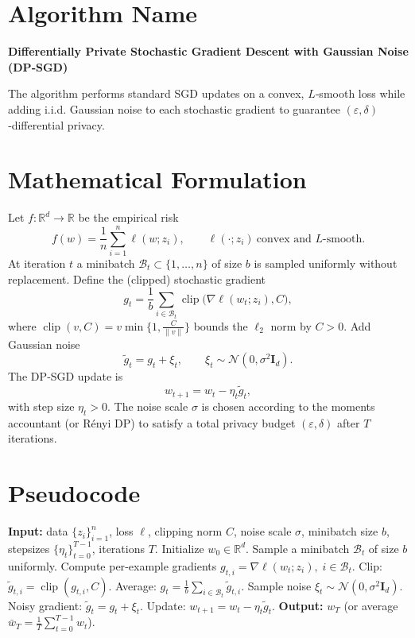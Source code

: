 \documentclass{article}
\newcommand{\RR}{\mathbb{R}}
\begin{document}
\section*{Algorithm Name}
\textbf{Differentially Private Stochastic Gradient Descent with Gaussian Noise (DP‑SGD)}  

The algorithm performs standard SGD updates on a convex, $L$‑smooth loss while adding i.i.d. Gaussian noise to each stochastic gradient to guarantee $(\varepsilon,\delta)$‑differential privacy.

\section*{Mathematical Formulation}
Let $f:\RR^{d}\rightarrow\RR$ be the empirical risk
\[
f(w)=\frac{1}{n}\sum_{i=1}^{n}\ell(w;z_i),\qquad 
\ell(\cdot;z_i)\ \text{convex and }L\text{-smooth}.
\]
At iteration $t$ a minibatch $\mathcal{B}_t\subset\{1,\dots ,n\}$ of size $b$ is sampled uniformly without replacement.  
Define the (clipped) stochastic gradient
\[
g_t = \frac{1}{b}\sum_{i\in\mathcal{B}_t}\operatorname{clip}\!\big(\nabla\ell(w_t;z_i),C\big),
\]
where $\operatorname{clip}(v,C)=v\min\{1,\frac{C}{\|v\|}\}$ bounds the $\ell_2$ norm by $C>0$.  
Add Gaussian noise
\[
\tilde g_t = g_t + \xi_t,\qquad \xi_t\sim\mathcal N(0,\sigma^2\mathbf I_d).
\]
The DP‑SGD update is
\[
w_{t+1}= w_t - \eta_t \tilde g_t,
\tag{1}
\]
with step size $\eta_t>0$.  
The noise scale $\sigma$ is chosen according to the moments accountant (or R\'enyi DP) to satisfy a total privacy budget $(\varepsilon,\delta)$ after $T$ iterations.

\section*{Pseudocode}
\begin{algorithm}[h]
\caption{DP‑SGD}
\begin{algorithmic}[1]
\State \textbf{Input:} data $\{z_i\}_{i=1}^n$, loss $\ell$, clipping norm $C$, noise scale $\sigma$, minibatch size $b$, stepsizes $\{\eta_t\}_{t=0}^{T-1}$, iterations $T$.
\State Initialize $w_0\in\RR^{d}$.
    \State Sample a minibatch $\mathcal B_t$ of size $b$ uniformly.
    \State Compute per‑example gradients $g_{t,i}= \nabla\ell(w_t;z_i),\; i\in\mathcal B_t$.
    \State Clip: $\tilde g_{t,i}= \operatorname{clip}(g_{t,i},C)$.
    \State Average: $g_t=\frac{1}{b}\sum_{i\in\mathcal B_t}\tilde g_{t,i}$.
    \State Sample noise $\xi_t\sim\mathcal N(0,\sigma^2\mathbf I_d)$.
    \State Noisy gradient: $\tilde g_t = g_t+\xi_t$.
    \State Update: $w_{t+1}= w_t-\eta_t\tilde g_t$.
\EndFor
\State \textbf{Output:} $w_T$ (or average $\bar w_T=\frac{1}{T}\sum_{t=0}^{T-1}w_t$).
\end{algorithmic}
\end{algorithm}
\end{document}
